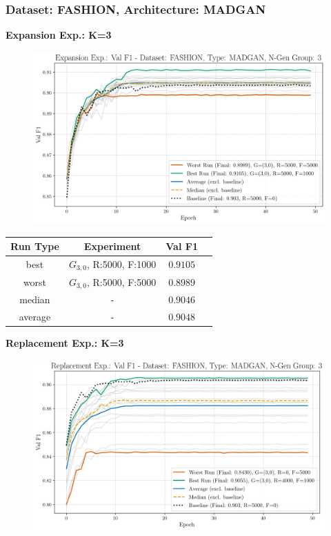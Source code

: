 \subsubsection{Dataset: FASHION, Architecture: MADGAN}
\noindent\textbf{Expansion Exp.: K=3}
\begin{figure}[htbp]
	\centering
	\includegraphics[width=.85\textwidth]{abb/strat_classifier_performance/FASHION_STRATIFIED_CLASSIFIERS_MADGAN_NEW/expansion_experiments/val_f1_score_MADGAN_FASHION_n_gen_3_all.png}
	\label{fig:app_strat_class_performance_expansion_exp._val_f1_score_3}
\end{figure}
\begin{table}[H]
	\vspace{-1em}
	\centering
	\begin{tabular}{|c|c|c|c|}
		\hline
		Run Type & Experiment & Val F1 \\ \hline
		best & \(G_{3, 0}\), R:5000, F:1000 & $0.9105$\\ \hline
		worst & \(G_{3, 0}\), R:5000, F:5000 & $0.8989$\\ \hline
		median & - & $0.9046$\\ \hline
		average & - & $0.9048$
		\\ \hline
	\end{tabular}
\end{table}
\noindent\textbf{Replacement Exp.: K=3}
\begin{figure}[htbp]
	\centering
	\includegraphics[width=.85\textwidth]{abb/strat_classifier_performance/FASHION_STRATIFIED_CLASSIFIERS_MADGAN_NEW/replacement_experiments/val_f1_score_MADGAN_FASHION_n_gen_3_all.png}
	\label{fig:app_strat_class_performance_replacement_exp._val_f1_score_3}
\end{figure}
